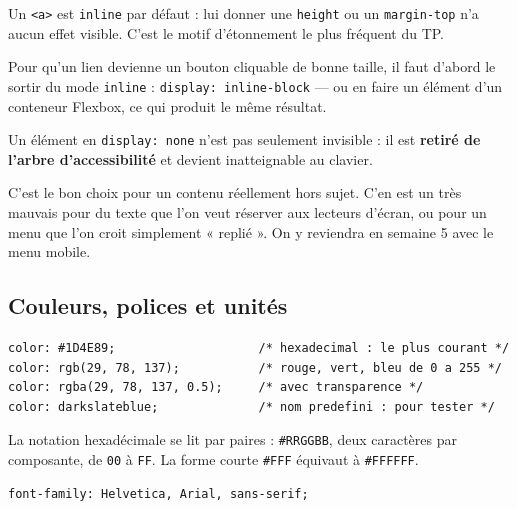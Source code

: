 \documentclass[a4paper,11pt]{article}
\begin{document}
\begin{tcolorbox}[attention, title={Pourquoi la hauteur d'un lien ne change pas}]
Un \texttt{<a>} est \texttt{inline} par défaut : lui donner une \texttt{height} ou un \texttt{margin-top} n'a aucun effet visible. C'est le motif d'étonnement le plus fréquent du TP.

\vspace{3pt}
Pour qu'un lien devienne un bouton cliquable de bonne taille, il faut d'abord le sortir du mode \texttt{inline} : \texttt{display: inline-block} --- ou en faire un élément d'un conteneur Flexbox, ce qui produit le même résultat.
\end{tcolorbox}

\begin{tcolorbox}[interdit, title={\texttt{display: none} cache aussi aux lecteurs d'écran}]
Un élément en \texttt{display: none} n'est pas seulement invisible : il est \textbf{retiré de l'arbre d'accessibilité} et devient inatteignable au clavier.

\vspace{3pt}
C'est le bon choix pour un contenu réellement hors sujet. C'en est un très mauvais pour du texte que l'on veut réserver aux lecteurs d'écran, ou pour un menu que l'on croit simplement « replié ». On y reviendra en semaine 5 avec le menu mobile.
\end{tcolorbox}

\subsection{Couleurs, polices et unités}

\begin{lstlisting}[language=CSS3, caption={Écrire une couleur}]
color: #1D4E89;                    /* hexadecimal : le plus courant */
color: rgb(29, 78, 137);           /* rouge, vert, bleu de 0 a 255 */
color: rgba(29, 78, 137, 0.5);     /* avec transparence */
color: darkslateblue;              /* nom predefini : pour tester */
\end{lstlisting}

La notation hexadécimale se lit par paires : \texttt{\#RRGGBB}, deux caractères par composante, de \texttt{00} à \texttt{FF}. La forme courte \texttt{\#FFF} équivaut à \texttt{\#FFFFFF}.

\begin{lstlisting}[language=CSS3, caption={Une pile de polices}]
font-family: Helvetica, Arial, sans-serif;
\end{lstlisting}
\end{document}
